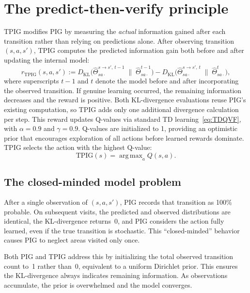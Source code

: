 \documentclass[letterpaper]{article}
\DeclareMathOperator*{\argmax}{arg\,max}
\begin{document}
\section{The predict-then-verify principle}

TPIG modifies PIG by measuring the \emph{actual} information gained
after each transition rather than relying on predictions alone.  After
observing transition $(s,a,s')$, TPIG computes the predicted
information gain both before and after updating the internal model:
\begin{equation}
  r_{\textrm{TPIG}}(s,a,s') :=
  D_{\textrm{KL}}\!\bigl(\hat{\Theta}_{sa\cdot}^{s \to s',\,t-1}
  \;\|\;\hat{\Theta}_{sa\cdot}^{t-1}\bigr)
  - D_{\textrm{KL}}\!\bigl(\hat{\Theta}_{sa\cdot}^{s \to s',\,t}
  \;\|\;\hat{\Theta}_{sa\cdot}^{t}\bigr),
  \label{eq:TPIGReward}
\end{equation}
where superscripts $t{-}1$ and $t$ denote the model before and after
incorporating the observed transition.  If genuine learning occurred,
the remaining information decreases and the reward is positive.
Both KL-divergence evaluations reuse PIG's existing computation, so
TPIG adds only one additional divergence calculation per step.
This reward updates Q-values via standard TD
learning~\eqref{eq:TDQVF}, with $\alpha = 0.9$ and $\gamma = 0.9$.
Q-values are initialized to 1, providing an optimistic prior that
encourages exploration of all actions before learned rewards dominate.
TPIG selects the action with the highest Q-value:
\[
  \textrm{TPIG}(s) = \argmax_a Q(s,a).
\]

\subsection{The closed-minded model problem}

After a single observation of $(s,a,s')$, PIG records that transition
as 100\% probable.  On subsequent visits, the predicted and observed
distributions are identical, the KL-divergence returns~0, and PIG
considers the action fully learned, even if the true transition is
stochastic.  This ``closed-minded'' behavior causes PIG to neglect
areas visited only once.

Both PIG and TPIG address this by initializing the total observed
transition count to~1 rather than~0, equivalent to a uniform Dirichlet
prior.  This ensures the KL-divergence always indicates remaining
information.  As observations accumulate, the prior is overwhelmed
and the model converges.
\end{document}
